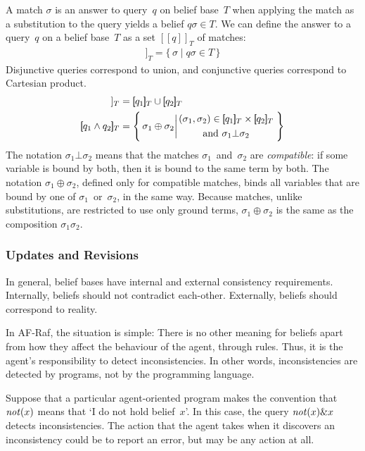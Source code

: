 \documentclass[a4paper,12pt,oneside,fleqn]{book} %
\newcommand{\eval}[1]{[\!\![#1]\!\!]}
\newcommand{\on}[2]{\genfrac{}{}{0pt}{0}{\strut#1}{\strut#2}}
\newcommand{\todo}[1]{[\textcolor{red}{TODO}: #1]}
\begin{document}
A match $\sigma$ is an answer to query~$q$ on belief base~$T$
  when applying the match as a substitution to the query yields a belief
  $q\sigma \in T$.
We can define the answer to a query~$q$ on a belief base~$T$
  as a set $\eval{q}_T$ of matches:
\begin{align}
  \eval{q}_T
  =
  \{\,\sigma\mid q\sigma \in T\,\}
\end{align}
Disjunctive queries correspond to union,
  and conjunctive queries correspond to Cartesian product.
\begin{align}
  \eval{q_1 \lor q_2}_T
    &= \eval{q_1}_T \cup \eval{q_2}_T
\\
  \eval{q_1 \land q_2}_T
    &= \left\{\,\sigma_1\oplus\sigma_2
    \bigg\vert
    \on{
      (\sigma_1,\sigma_2)\in
      \eval{q_1}_T \times \eval{q_2}_T}%
      {\text{and $\sigma_1\bot\sigma_2$}}
\,\right\}
\end{align}
The notation $\sigma_1\bot\sigma_2$ means that the matches
$\sigma_1$~and~$\sigma_2$ are \emph{compatible}: if some variable is bound
by both, then it is bound to the same term by both. The notation
$\sigma_1\oplus\sigma_2$, defined only for compatible matches, binds all
variables that are bound by one of $\sigma_1$~or~$\sigma_2$, in the same
way. Because matches, unlike substitutions, are restricted to use only
ground terms, $\sigma_1\oplus\sigma_2$ is the same as the composition
$\sigma_1\sigma_2$.


\subsubsection{Updates and Revisions}

In general, belief bases have internal and external consistency
requirements.  Internally, beliefs should not contradict each-other.
Externally, beliefs should correspond to reality.

In AF-Raf, the situation is simple: There is no other meaning for beliefs
apart from how they affect the behaviour of the agent, through rules.
Thus, it is the agent's responsibility to detect inconsistencies.  In other
words, inconsistencies are detected by programs, not by the programming
language.

\begin{example} Suppose that a particular agent-oriented program makes the
convention that ${\it not}(x)$ means that `I do not hold belief~$x$'.  In
this case, the query ${\it not}(x)\&x$ detects inconsistencies.  The action
that the agent takes when it discovers an inconsistency could be to report
an error, but may be any action at all.  \end{example}
\end{document}
